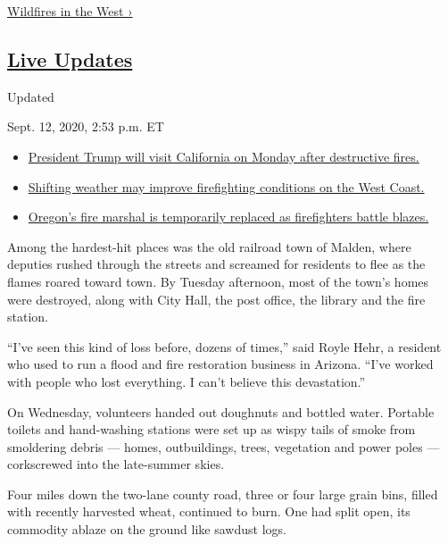 \href{https://www.nytimes3xbfgragh.onion/spotlight/california-wildfires}{Wildfires
in the West ›}

\hypertarget{live-updates}{%
\subsection{\texorpdfstring{\href{https://www.nytimes3xbfgragh.onion/2020/09/12/us/wildfires-live-updates.html}{Live
Updates}}{Live Updates}}\label{live-updates}}

Updated~

Sept. 12, 2020, 2:53 p.m. ET

\begin{itemize}
\tightlist
\item
  \href{https://www.nytimes3xbfgragh.onion/2020/09/12/us/wildfires-live-updates.html\#link-f3961ff}{President
  Trump will visit California on Monday after destructive fires.}
\item
  \href{https://www.nytimes3xbfgragh.onion/2020/09/12/us/wildfires-live-updates.html\#link-7e503ae9}{Shifting
  weather may improve firefighting conditions on the West Coast.}
\item
  \href{https://www.nytimes3xbfgragh.onion/2020/09/12/us/wildfires-live-updates.html\#link-5e4c548d}{Oregon's
  fire marshal is temporarily replaced as firefighters battle blazes.}
\end{itemize}

Among the hardest-hit places was the old railroad town of Malden, where
deputies rushed through the streets and screamed for residents to flee
as the flames roared toward town. By Tuesday afternoon, most of the
town's homes were destroyed, along with City Hall, the post office, the
library and the fire station.

``I've seen this kind of loss before, dozens of times,'' said Royle
Hehr, a resident who used to run a flood and fire restoration business
in Arizona. ``I've worked with people who lost everything. I can't
believe this devastation.''

On Wednesday, volunteers handed out doughnuts and bottled water.
Portable toilets and hand-washing stations were set up as wispy tails of
smoke from smoldering debris --- homes, outbuildings, trees, vegetation
and power poles --- corkscrewed into the late-summer skies.

Four miles down the two-lane county road, three or four large grain
bins, filled with recently harvested wheat, continued to burn. One had
split open, its commodity ablaze on the ground like sawdust logs.

